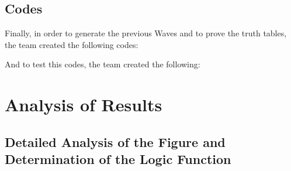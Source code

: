 \documentclass[12pt]{article}  %
\begin{document}
\subsection{Codes}
Finally, in order to generate the previous Waves and to prove the truth tables, the team created the following codes:


And to test this codes, the team created the following:


\section{Analysis of Results}

\subsection{Detailed Analysis of the Figure and Determination of the Logic Function}
\end{document}
